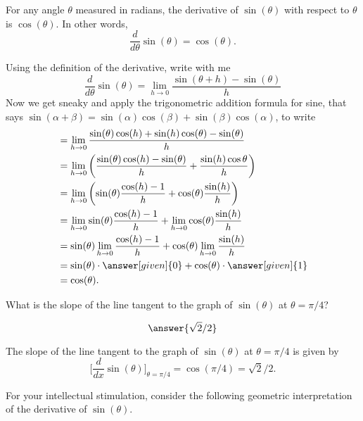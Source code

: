 \documentclass{ximera}
\begin{document}
\begin{theorem}\label{theorem:deriv sin}
For any angle $\theta$ measured in radians, the derivative of $\sin(\theta)$ with respect to $\theta$ is $\cos(\theta)$.  In other words, 
\[
\frac{d}{d\theta} \sin(\theta) = \cos(\theta).
\]
\begin{explanation}
Using the definition of the derivative, write with me
\[
\frac{d}{d\theta} \sin(\theta) = \lim_{h\to0} \frac{\sin(\theta+h)-\sin(\theta)}{h}
\]
Now we get sneaky and apply the trigonometric addition formula for sine, that says $\sin(\alpha+\beta) = \sin(\alpha)\cos(\beta)+\sin(\beta)\cos(\alpha)$, to write
\begin{align*}
  &= \lim_{h\to0} \frac{\sin(\theta)\cos(h)+\sin(h)\cos(\theta)-\sin(\theta)}{h}  \\
  &= \lim_{h\to0} \left(\frac{\sin(\theta)\cos(h)-\sin(\theta)}{h} + \frac{\sin(h)\cos{\theta}}{h} \right)\\
  &=\lim_{h\to0} \left(\sin (\theta)\frac{\cos(h) - 1}{h}+\cos(\theta)\frac{\sin(h)}{h}\right) \\
   &=\lim_{h\to0} \sin (\theta)\frac{\cos(h) - 1}{h}+\lim_{h\to0}\cos(\theta)\frac{\sin(h)}{h} \\
     &= \sin (\theta)\lim_{h\to0}\frac{\cos(h) - 1}{h}+\cos(\theta)\lim_{h\to0}\frac{\sin(h)}{h} \\
  &=\sin(\theta) \cdot \answer[given]{0} + \cos(\theta) \cdot \answer[given]{1}\\
  &= \cos(\theta). 
\end{align*}
\end{explanation}
\end{theorem}

\begin{question}
  What is the slope of the line tangent to the graph of $\sin(\theta)$ at $\theta =
  \pi/4$?
  \begin{prompt}
    \[
    \answer{\sqrt{2}/2}
    \]
  \end{prompt}
  \begin{explanation}
  The slope of the line tangent to the graph of $\sin(\theta)$ at $\theta =
  \pi/4$ is given by 
  \[
 \bigg[ \frac{d}{dx}\sin(\theta) \bigg]_{\theta= \pi/4}=\cos(\pi/4)=\sqrt{2}/2. 
  \]

    \end{explanation}
\end{question}

For your intellectual stimulation, consider the following geometric
interpretation of the derivative of $\sin(\theta)$.
\end{document}
